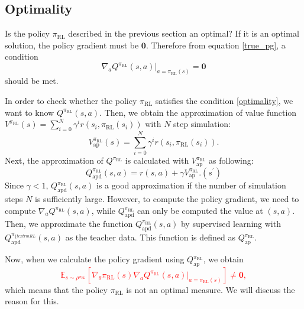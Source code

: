 \documentclass[english, dvipdfmx]{ampmt}             %
\newcommand{\unc}[1]{\textcolor{red}{#1}} %
\newcommand{\expect}{\mathbb{E}}
\begin{document}
\subsection{Optimality}
Is the policy $\pi_{\textrm{RL}}$ described in the previous section an optimal? If it is an optimal solution, the policy gradient must be $\bm{0}$. Therefore from equation \eqref{true_pg}, a condition
\begin{equation}
	\nabla_a Q^{\pi_{\textrm{RL}}}(s,a)|_{a=\pi_{\textrm{RL}}(s)} = \bm{0}
\end{equation}
should be met. \par
In order to check whether the policy $\pi_{\textrm{RL}}$ satisfies the condition \eqref{optimality}, we want to know $Q^{\pi_{\textrm{RL}}}(s,a)$. Then, we obtain the approximation of value function $V^{\pi_{\textrm{RL}}}(s) = \sum_{i=0}^{N}\gamma^i r(s_i,\pi_{\textrm{RL}}(s_i))$ with $N$ step simulation:
\begin{equation}
	V^{\pi_{\textrm{RL}}}_{\textrm{ap}}(s) = \sum_{i=0}^{N}\gamma^i r(s_i,\pi_{\textrm{RL}}(s_i)).
\end{equation}
Next, the approximation of $Q^{\pi_{\textrm{RL}}}$ is calculated with $V^{\pi_{\textrm{RL}}}_{\textrm{ap}}$ as following:
\begin{equation}
	Q^{\pi_{\textrm{RL}}}_{\textrm{apd}}(s,a) = r(s,a) + \gamma V^{\pi_{\textrm{RL}}}_{\textrm{ap}}.(s^{\prime})
\end{equation}
Since $\gamma < 1$, $Q^{\pi_{\textrm{RL}}}_{\textrm{apd}}(s,a)$ is a good approximation if the number of simulation steps $N$ is sufficiently large. However, to compute the policy gradient, we need to compute $\nabla_{a}Q^{\pi_{\textrm{RL}}}(s, a)$, while $Q^{\pi_{\textrm{RL}}}_{\textrm{apd}}$ can only be computed the value at $(s,a)$. Then, we approximate the function $Q^{\pi_{\textrm{RL}}}_{\textrm{apd}}(s,a)$ by supervised learning with $Q^{\pi_{\{textrm{RL}}}_{\textrm{apd}}(s,a)$ as the teacher data. This function is defined as $Q^{\pi_{\textrm{RL}}}_{\textrm{ap}}$.\par
Now, when we calculate the policy gradient using $Q^{\pi_{\textrm{RL}}}_{\textrm{ap}}$, we obtain
\unc{
\begin{equation}
	\expect_{s\sim\rho^{\pi_{\textrm{RL}}}}[
	\nabla_{\theta}\pi_{\textrm{RL}}(s)\nabla_{a}Q^{\pi_{\textrm{RL}}}(s, a)|_{a=\pi_{\textrm{RL}}(s)}] \neq \bm{0}, 
\end{equation}
}
which means that the policy $\pi_{\textrm{RL}}$ is not an optimal measure. We will discuss the reason for this.
\end{document}
